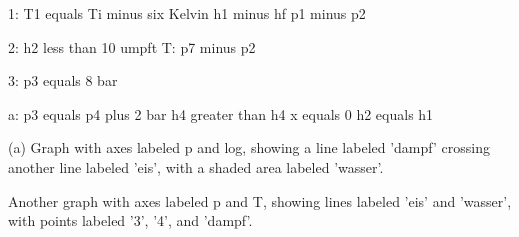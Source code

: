1: T1 equals Ti minus six Kelvin  
h1 minus hf  
p1 minus p2  

2: h2 less than 10 umpft  
T: p7 minus p2  

3: p3 equals 8 bar  

a: p3 equals p4 plus 2 bar  
h4 greater than h4  
x equals 0  
h2 equals h1  

(a)  
Graph with axes labeled p and log, showing a line labeled 'dampf' crossing another line labeled 'eis', with a shaded area labeled 'wasser'.  

Another graph with axes labeled p and T, showing lines labeled 'eis' and 'wasser', with points labeled '3', '4', and 'dampf'.
